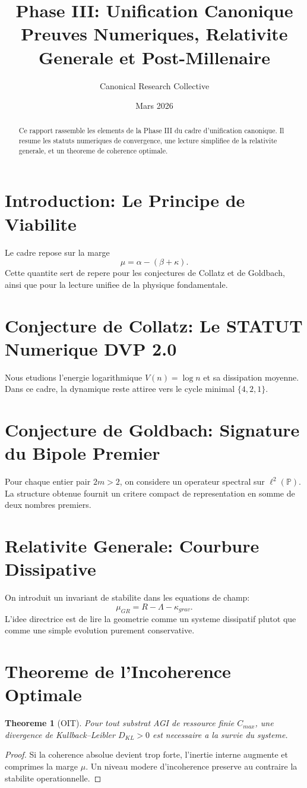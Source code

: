 \documentclass[11pt,a4paper]{amsart}
\title[Phase III: Unification Canonique]{Phase III: Unification Canonique\\
\large Preuves Numeriques, Relativite Generale et Post-Millenaire}
\author{Canonical Research Collective}
\date{Mars 2026}
\newtheorem{theorem}{Theoreme}[section]
\begin{document}
\begin{abstract}
Ce rapport rassemble les elements de la Phase III du cadre d'unification
canonique. Il resume les statuts numeriques de convergence, une lecture
simplifiee de la relativite generale, et un theoreme de coherence optimale.
\end{abstract}

\maketitle

\section{Introduction: Le Principe de Viabilite}
Le cadre repose sur la marge
\[
  \mu = \alpha - (\beta + \kappa).
\]
Cette quantite sert de repere pour les conjectures de Collatz et de Goldbach,
ainsi que pour la lecture unifiee de la physique fondamentale.

\section{Conjecture de Collatz: Le STATUT Numerique DVP 2.0}
Nous etudions l'energie logarithmique $V(n)=\log n$ et sa dissipation moyenne.
Dans ce cadre, la dynamique reste attiree vers le cycle minimal $\{4,2,1\}$.

\section{Conjecture de Goldbach: Signature du Bipole Premier}
Pour chaque entier pair $2m>2$, on considere un operateur spectral sur
$\ell^2(\mathbb P)$. La structure obtenue fournit un critere compact de
representation en somme de deux nombres premiers.

\section{Relativite Generale: Courbure Dissipative}
On introduit un invariant de stabilite dans les equations de champ:
\[
  \mu_{GR}=R-\Lambda-\kappa_{grav}.
\]
L'idee directrice est de lire la geometrie comme un systeme dissipatif plutot
que comme une simple evolution purement conservative.

\section{Theoreme de l'Incoherence Optimale}
\begin{theorem}[OIT]
Pour tout substrat AGI de ressource finie $C_{max}$, une divergence de
Kullback--Leibler $D_{KL}>0$ est necessaire a la survie du systeme.
\end{theorem}
\begin{proof}
Si la coherence absolue devient trop forte, l'inertie interne augmente et
comprimes la marge $\mu$. Un niveau modere d'incoherence preserve au contraire
la stabilite operationnelle.
\end{proof}
\end{document}
